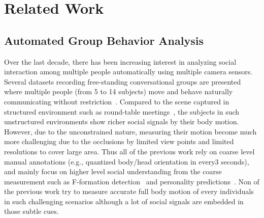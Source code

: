 \section{Related Work}
\subsection{Automated Group Behavior Analysis}
Over the last decade, there has been increasing interest in analyzing social interaction among multiple people automatically using multiple camera sensors. Several datasets recording free-standing conversational groups are presented where multiple people (from 5 to 14 subjects) move and behave naturally communicating without restriction~\cite{Zen-10,Cristani-11, SALSA-15}. Compared to the scene captured in structured environment such as round-table meetings~\cite{Lepri-12}, the subjects in such unstructured environments show richer social signals by their body motion. However, due to the unconstrained nature, measuring their motion become much more challenging due to the occlusions by limited view points and limited resolutions to cover large area. Thus all of the previous work rely on coarse level manual annotations (e.g., quantized body/head orientation in every3 seconds), and mainly focus on higher level social understanding from the coarse measurement such as F-formation detection~\cite{Lepri-12} and personality predictions~\cite{SALSA-15,Zen-10}. Non of the previous work try to measure accurate full body motion of every individuals in such challenging scenarios although a lot of social signals are embedded in those subtle cues. 

